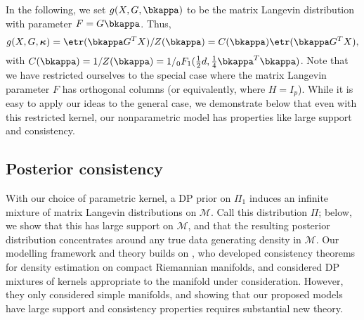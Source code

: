In the following, we set $g(X,G,\bkappa)$ to be the matrix Langevin distribution with parameter $F = G\bkappa$. Thus,
\begin{equation}
g(X,G,\boldsymbol\kappa)=\etr(\bkappa G^TX)/Z(\bkappa)=C(\bkappa)\etr(\bkappa G^TX),
\end{equation}
with $C(\bkappa)=1/Z(\bkappa)=1/ _{0}F_1(\frac{1}{2}d, \frac{1}{4}\bkappa^T\bkappa)$.
Note that we have restricted ourselves to the special case where the matrix Langevin parameter $F$ has orthogonal columns (or equivalently, where $H = I_p$). While it
 is easy to apply our ideas to the general case, we demonstrate below that even with this restricted kernel, our nonparametric model has properties like
large support and consistency.

\subsection{Posterior consistency}
With our choice of parametric kernel, a DP prior on $\Pi_1$ induces 
an infinite mixture of matrix Langevin distributions on $\mathcal{M}$. Call this distribution $\Pi$;
below, we show that this has large support on $\mathcal{M}$, and
that the resulting posterior distribution concentrates around  any true data generating density in $\mathcal{M}$. Our modelling framework and theory builds on \cite{abs1,abs2}, who developed consistency theorems for density estimation on compact Riemannian manifolds, and considered DP mixtures of kernels appropriate to the manifold under consideration.  However, they only considered simple manifolds, and showing that our proposed models have large support and consistency properties requires substantial new theory.

